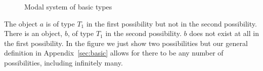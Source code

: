 \begin{figure}[h]
\begin{adjustbox}{max width=\textwidth}
\begin{tikzpicture}
    
\end{tikzpicture}
\end{adjustbox}

\caption{Modal system of basic types}
\label{fig:modal}
\end{figure}
The object $a$ is
of type $T_1$ in the first possibility but not in the second
possibility.  There is an object, $b$, of type $T_1$ in the second
possibility.  $b$ does not exist at all in the first possibility.
In the
figure we just show two possibilities but our general definition in Appendix~\ref{sec:basic}
allows for there to be any number of possibilities, including
infinitely many.

